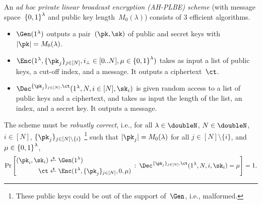 \begin{definition}[AH-PLBE]\label{def:ahplbe}
An \emph{ad hoc private linear broadcast encryption (AH-PLBE) scheme}
(with message space~${\{0,1\}}^\lambda$ and public key length~$M_0(\lambda)$)
consists of 3 efficient algo\-rithms.
\begin{itemize}
\item $\Gen(1^\lambda)$ outputs a pair~$(\pk,\sk)$ of public and secret keys
with ${|\pk|=M_0(\lambda)}$.
\item $\Enc(1^\lambda,\{\pk_j\}_{j\in[N]},{i_\bot\in[0..N]},{\mu\in\bit^\lambda})$
takes as input
a list of public keys,
a cut-off index,
and a message.
It outputs a ciphertext~$\ct$.
\item $\Dec^{\{\pk_j\}_{j\in[N]},\ct}(1^\lambda,N,{i\in[N]},\sk_i)$
is given random access to a list of public keys and a ciphertext, and
takes as input
the length of the list,
an index, and
a secret key.
It outputs a message.
\end{itemize}
The scheme must be \emph{robustly correct}, i.e., for all
${\lambda\in\doubleN}$,
${N\in\doubleN}$,
${i\in[N]}$,\WideNarrow{}{\linebreak[4]}
$\{\pk_j\}_{j\in[N]\setminus\{i\}}$%
\footnote{These public keys could be out of the support of~$\Gen$,
i.e., malformed.}
such that ${|\pk_j|=M_0(\lambda)}$ for all ${j\in[N]\setminus\{i\}}$, and
${\mu\in{\{0,1\}}^\lambda}$,
\begin{align*}
\Pr\left[
\begin{aligned}
(\pk_i,\sk_i)&{}\draws\Gen(1^\lambda)\\
\ct&{}\draws\Enc(1^\lambda,\{\pk_j\}_{j\in[N]},0,\mu)
\end{aligned}
\WideNarrow{\::\:}{\:{:}\:}
\Dec^{\{\pk_j\}_{j\in[N]},\ct}(1^\lambda,N,i,\sk_i)=\mu
\right]=1.
\end{align*}
\end{definition}
